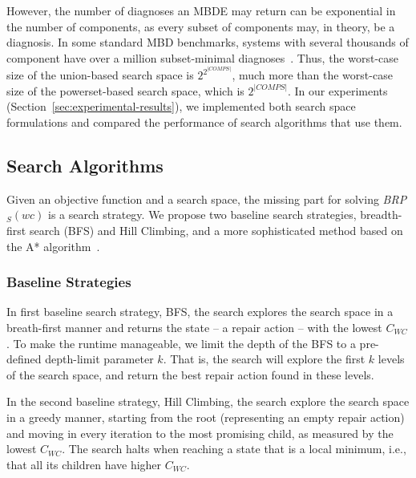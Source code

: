 \documentclass[review]{elsarticle}
\newcommand{\brpswc}{\textit{BRP$_S(wc)$}}
\newcommand{\COMPS}{\textit{COMPS}}
\begin{document}
However, the number of diagnoses an MBDE may return can be exponential in the number of components, as every subset of components may, in theory, be a diagnosis. 
In some standard MBD benchmarks, systems with several thousands of component have over a million subset-minimal diagnoses~\cite{Stern17shelly}. 
Thus, the worst-case size of the union-based search space is $2^{2^{|\COMPS|}}$, much more than the worst-case size of the powerset-based search space, which is $2^{|\COMPS|}$. 
In our experiments (Section~\ref{sec:experimental-results}), we implemented both search space formulations and compared the performance of search algorithms that use them. 



\subsection{Search Algorithms}

Given an objective function and a search space, 
the missing part for solving \brpswc{} is a search strategy. We propose two baseline search strategies, breadth-first search (BFS) and Hill Climbing, and a more sophisticated method based on the A* algorithm~\cite{hart1968formal}. 


\subsubsection{Baseline Strategies}

In first baseline search strategy, BFS, 
the search explores the search space in a breath-first manner and returns the state -- a repair action -- with the lowest $C_{WC}$. 
To make the runtime manageable, we limit the depth of the BFS to a pre-defined depth-limit parameter $k$. That is, the search will explore the first $k$ levels of the search space, and return the best repair action found in these levels. 


In the second baseline strategy, Hill Climbing, 
the search explore the search space in a greedy manner, starting from the root (representing an empty repair action) and moving in every iteration to the most promising child, as measured by the lowest $C_{WC}$. The search halts when reaching a state that is a local minimum, i.e., that all its children have higher $C_{WC}$. 
\end{document}
